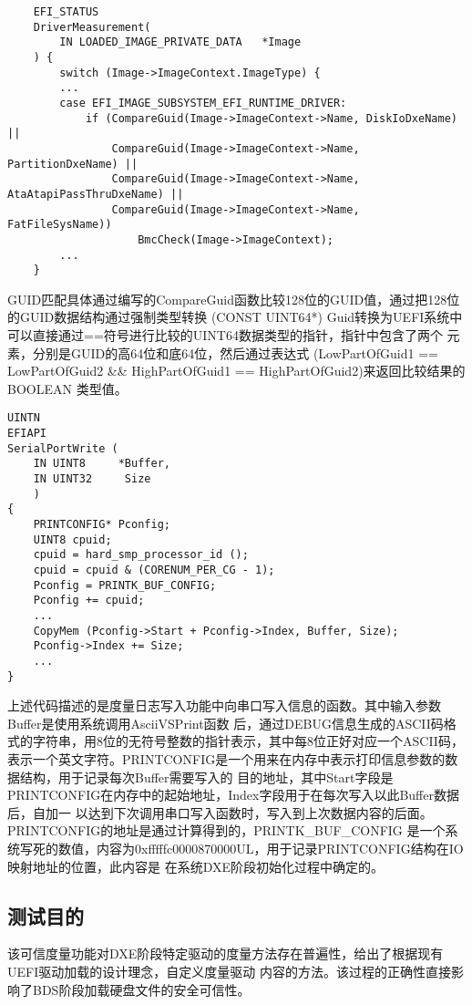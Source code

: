 \begin{lstlisting}
    EFI_STATUS
    DriverMeasurement(
        IN LOADED_IMAGE_PRIVATE_DATA   *Image
    ) {
        switch (Image->ImageContext.ImageType) {
        ...
        case EFI_IMAGE_SUBSYSTEM_EFI_RUNTIME_DRIVER:
            if (CompareGuid(Image->ImageContext->Name, DiskIoDxeName) ||
                CompareGuid(Image->ImageContext->Name, PartitionDxeName) ||
                CompareGuid(Image->ImageContext->Name, AtaAtapiPassThruDxeName) ||
                CompareGuid(Image->ImageContext->Name, FatFileSysName))
                    BmcCheck(Image->ImageContext);
        ...
    }
\end{lstlisting}
\par GUID匹配具体通过编写的CompareGuid函数比较128位的GUID值，通过把128位的GUID数据结构通过强制类型转换
(CONST UINT64*) Guid转换为UEFI系统中可以直接通过==符号进行比较的UINT64数据类型的指针，指针中包含了两个
元素，分别是GUID的高64位和底64位，然后通过表达式
(LowPartOfGuid1 == LowPartOfGuid2 \&\& HighPartOfGuid1 == HighPartOfGuid2)来返回比较结果的BOOLEAN
类型值。
\begin{lstlisting}
UINTN
EFIAPI
SerialPortWrite (
    IN UINT8     *Buffer,
    IN UINT32     Size
    )
{
    PRINTCONFIG* Pconfig;
    UINT8 cpuid;
    cpuid = hard_smp_processor_id ();
    cpuid = cpuid & (CORENUM_PER_CG - 1);
    Pconfig = PRINTK_BUF_CONFIG;
    Pconfig += cpuid;
    ...
    CopyMem (Pconfig->Start + Pconfig->Index, Buffer, Size);
    Pconfig->Index += Size;
    ...
}
\end{lstlisting}
上述代码描述的是度量日志写入功能中向串口写入信息的函数。其中输入参数Buffer是使用系统调用AsciiVSPrint函数
后，通过DEBUG信息生成的ASCII码格式的字符串，用8位的无符号整数的指针表示，其中每8位正好对应一个ASCII码，
表示一个英文字符。PRINTCONFIG是一个用来在内存中表示打印信息参数的数据结构，用于记录每次Buffer需要写入的
目的地址，其中Start字段是PRINTCONFIG在内存中的起始地址，Index字段用于在每次写入以此Buffer数据后，自加一
以达到下次调用串口写入函数时，写入到上次数据内容的后面。PRINTCONFIG的地址是通过计算得到的，PRINTK\_BUF\_CONFIG
是一个系统写死的数值，内容为0xfffffc0000870000UL，用于记录PRINTCONFIG结构在IO映射地址的位置，此内容是
在系统DXE阶段初始化过程中确定的。

\subsection{测试目的}
该可信度量功能对DXE阶段特定驱动的度量方法存在普遍性，给出了根据现有UEFI驱动加载的设计理念，自定义度量驱动
内容的方法。该过程的正确性直接影响了BDS阶段加载硬盘文件的安全可信性。

